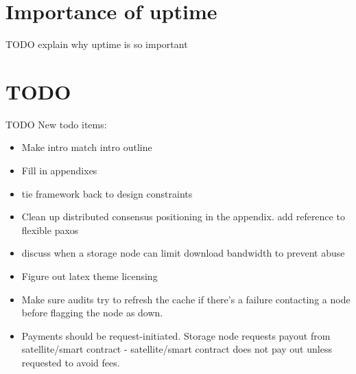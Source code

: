 \documentclass[11pt,fleqn,openany]{book}
\newcommand{\todo}[1]{{\color{red} TODO #1 }}
\begin{document}
\chapter{Importance of uptime}\label{appendix:uptime-importance}

\todo{explain why uptime is so important}

\chapter{TODO}

\todo{
New todo items:
\begin{itemize}
\item Make intro match intro outline
\item Fill in appendixes
\item tie framework back to design constraints
\item Clean up distributed consensus positioning in the appendix.
  add reference to flexible paxos
\item discuss when a storage node can limit download bandwidth to prevent
  abuse
\item Figure out latex theme licensing
\item Make sure audits try to refresh the cache if there's a failure contacting
  a node before flagging the node as down.
\item Payments should be request-initiated. Storage node requests payout from
  satellite/smart contract - satellite/smart contract does not pay out unless
  requested to avoid fees.
\end{itemize}
}

\newpage

\begingroup
\raggedright

\endgroup
\end{document}
